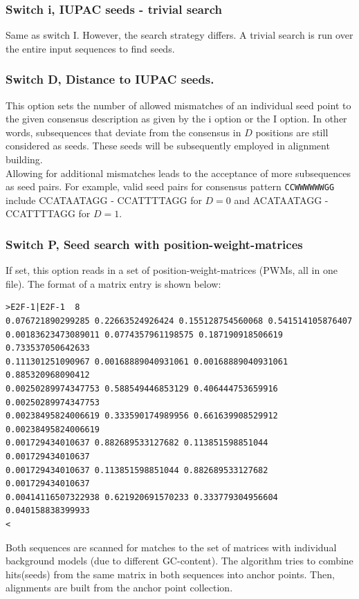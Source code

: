 \documentclass{article}
\begin{document}
\subsubsection*{Switch i, IUPAC seeds - trivial search}
Same as switch I. However, the search strategy differs. A trivial search is run over the entire input sequences to find seeds.
\subsubsection*{Switch D, Distance to IUPAC seeds.}
This option sets the number of allowed mismatches of an individual seed point to the given consensus description as given by the i option or the I option. In other words, subsequences that deviate from the consensus in $D$ positions are still considered as seeds. These seeds will be subsequently employed in alignment building.\\
Allowing for additional mismatches leads to the acceptance of more subsequences as seed pairs. For example,  valid seed pairs for consensus pattern {\tt CCWWWWWWGG} include CCATAATAGG - CCATTTTAGG for $D=0$ and ACATAATAGG - CCATTTTAGG for $D=1$.
\subsubsection*{Switch P, Seed search with position-weight-matrices}
If set, this option reads in a set of position-weight-matrices (PWMs, all in one file). The format of a matrix entry is shown below:
\begin{verbatim}
>E2F-1|E2F-1  8
0.076721890299285 0.22663524926424 0.155128754560068 0.541514105876407
0.00183623473089011 0.0774357961198575 0.187190918506619 0.733537050642633
0.111301251090967 0.00168889040931061 0.00168889040931061 0.885320968090412
0.00250289974347753 0.588549446853129 0.406444753659916 0.00250289974347753
0.00238495824006619 0.333590174989956 0.661639908529912 0.00238495824006619
0.001729434010637 0.882689533127682 0.113851598851044 0.001729434010637
0.001729434010637 0.113851598851044 0.882689533127682 0.001729434010637
0.00414116507322938 0.621920691570233 0.333779304956604 0.040158838399933
<
\end{verbatim}
Both sequences are scanned for matches to the set of matrices with individual background models (due to different GC-content). The algorithm tries to combine hits(seeds) from the same matrix in both sequences into anchor points. Then, alignments are built from the anchor point collection.
\end{document}

